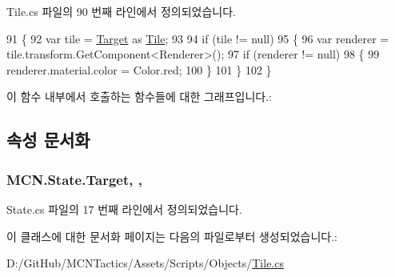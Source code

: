 Tile.\+cs 파일의 90 번째 라인에서 정의되었습니다.


\begin{DoxyCode}
91         \{
92             var tile = \hyperlink{class_m_c_n_1_1_state_a79a563b32f183c9adc9a96679fc57eb8}{Target} as \hyperlink{class_tile_a7684d2e86beeb06d844ebb7819b11b33}{Tile};
93 
94             \textcolor{keywordflow}{if} (tile != null)
95             \{
96                 var renderer = tile.transform.GetComponent<Renderer>();
97                 \textcolor{keywordflow}{if} (renderer != null)
98                 \{
99                     renderer.material.color = Color.red;
100                 \}
101             \}
102         \}
\end{DoxyCode}


이 함수 내부에서 호출하는 함수들에 대한 그래프입니다.\+:




\subsection{속성 문서화}
\subsubsection[{\texorpdfstring{Target}{Target}}]{ M\+C\+N.\+State.\+Target\hspace{0.3cm}{\ttfamily [get]}, {\ttfamily [protected]}, {\ttfamily [inherited]}}\hypertarget{class_m_c_n_1_1_state_a79a563b32f183c9adc9a96679fc57eb8}{}\label{class_m_c_n_1_1_state_a79a563b32f183c9adc9a96679fc57eb8}


State.\+cs 파일의 17 번째 라인에서 정의되었습니다.



이 클래스에 대한 문서화 페이지는 다음의 파일로부터 생성되었습니다.\+:\begin{DoxyCompactItemize}
\item 
D\+:/\+Git\+Hub/\+M\+C\+N\+Tactics/\+Assets/\+Scripts/\+Objects/\hyperlink{_tile_8cs}{Tile.\+cs}\end{DoxyCompactItemize}
